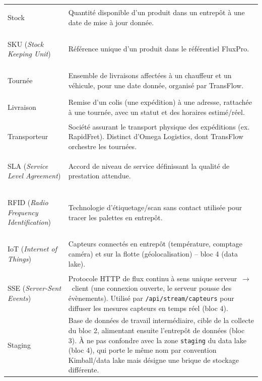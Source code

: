 \begin{longtable}{@{}>{\bfseries\raggedright}p{3.4cm} p{12.2cm}@{}}
\label{gloss:stock}Stock &
Quantité disponible d'un produit dans un entrepôt à une date de mise à
jour donnée. \\

\label{gloss:sku}SKU (\textit{Stock Keeping Unit}) &
Référence unique d'un produit dans le référentiel FluxPro. \\

\label{gloss:tournee}Tournée &
Ensemble de livraisons affectées à un chauffeur et un véhicule, pour
une date donnée, organisé par TransFlow. \\

\label{gloss:livraison}Livraison &
Remise d'un colis (une expédition) à une adresse, rattachée à une
tournée, avec un statut et des horaires estimé/réel. \\

\label{gloss:transporteur}Transporteur &
Société assurant le transport physique des expéditions (ex.
RapidFret). Distinct d'Omega Logistics, dont TransFlow orchestre les
tournées. \\

\label{gloss:sla}SLA (\textit{Service Level Agreement}) &
Accord de niveau de service définissant la qualité de prestation
attendue. \\

\label{gloss:rfid}RFID (\textit{Radio Frequency Identification}) &
Technologie d'étiquetage/scan sans contact utilisée pour tracer les
palettes en entrepôt. \\

\label{gloss:iot}IoT (\textit{Internet of Things}) &
Capteurs connectés en entrepôt (température, comptage caméra) et sur
la flotte (géolocalisation) -- bloc 4 (data lake). \\

\label{gloss:sse}SSE (\textit{Server-Sent Events}) &
Protocole HTTP de flux continu à sens unique serveur~$\rightarrow$~client
(une connexion ouverte, le serveur pousse des évènements). Utilisé par
\texttt{/api/stream/capteurs} pour diffuser les mesures capteurs en
temps réel (bloc 4). \\

\label{gloss:staging}Staging &
Base de données de travail intermédiaire, cible de la collecte du
bloc 2, alimentant ensuite l'entrepôt de données (bloc 3). À ne pas
confondre avec la zone \texttt{staging} du data lake (bloc 4), qui
porte le même nom par convention Kimball/data lake mais désigne une
brique de stockage différente. \\


\end{longtable}
